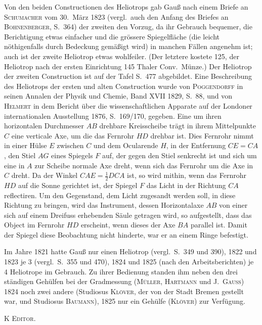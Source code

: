 \documentclass[12pt,a4paper]{article}
\theoremstyle{plain}
\theoremstyle{definition}
\theoremstyle{remark}
\begin{document}
Von den beiden Constructionen des Heliotrops gab Gau\ss{} nach einem Briefe an \textsc{Schumacher} vom 30.\ M\"arz 1823 (vergl.\ auch den Anfang des Briefes an \textsc{Bohnenberger}, S.~364) der zweiten den Vorzug, \glqq da ihr Gebrauch bequemer, die Berichtigung etwas einfacher und die gr\"ossere Spiegelfl\"ache (die leicht n\"othigenfalls durch Bedeckung gem\"a\ss igt wird) in manchen F\"allen angenehm ist; auch ist der zweite Heliotrop etwas wohlfeiler.\grqq{} (Der letztere kostete 125, der Heliotrop nach der ersten Einrichtung 145 Thaler Conv.\ M\"unze.) Der Heliotrop der zweiten Construction ist auf der Tafel S.~477 abgebildet. Eine Beschreibung des Heliotrops der ersten und alten Construction wurde von \textsc{Poggendorff} in seinen Annalen der Physik und Chemie, Band XVII 1829, S.~88, und von \textsc{Helmert} in dem Bericht \"uber die wissenschaftlichen Apparate auf der Londoner internationalen Ausstellung 1876, S.~169/170, gegeben. Eine um ihren horizontalen Durchmesser $AB$ drehbare Kreisscheibe tr\"agt in ihrem Mittelpunkte $C$ eine verticale Axe, um die das Fernrohr $HD$ drehbar ist. Dies Fernrohr nimmt in einer H\"ulse $E$ zwischen $C$ und dem Ocularende $H$, in der Entfernung $CE = CA$, den Stiel $AG$ eines Spiegels $F$ auf, der gegen den Stiel senkrecht ist und sich um eine in $A$ zur Scheibe normale Axe dreht, wenn sich das Fernrohr um die Axe in $C$ dreht. Da der Winkel $CAE = \tfrac12 DCA$ ist, so wird mithin, wenn das Fernrohr $HD$ auf die Sonne gerichtet ist, der Spiegel $F$ das Licht in der Richtung $CA$ reflectiren. Um den Gegenstand, dem Licht zugesandt werden soll, in diese Richtung zu bringen, wird das Instrument, dessen Horizontalaxe $AB$ von einer sich auf einem Dreifuss erhebenden S\"aule getragen wird, so aufgestellt, dass das Object im Fernrohr $HD$ erscheint, wenn dieses der Axe $BA$ parallel ist. Damit der Spiegel diese Beobachtung nicht hinderte, war er an einem Ringe befestigt.

Im Jahre 1821 hatte Gau\ss{} nur einen Heliotrop (vergl.\ S.~349 und 390), 1822 und 1823 je 3 (vergl.\ S.~355 und 470), 1824 und 1825 (nach den Arbeitsberichten) je 4 Heliotrope im Gebrauch. Zu ihrer Bedienung standen ihm neben den drei st\"andigen Geh\"ulfen bei der Gradmessung (\textsc{M\"uller}, \textsc{Hartmann} und \textsc{J.\ Gau\ss{}}) 1824 noch zwei andere (Studiosus \textsc{Kl\"over}, der von der Stadt Bremen gestellt war, und Studiosus \textsc{Baumann}), 1825 nur ein Geh\"ulfe (\textsc{Kl\"over}) zur Verf\"ugung.

\hfill\textsc{K Editor.}
\end{document}
